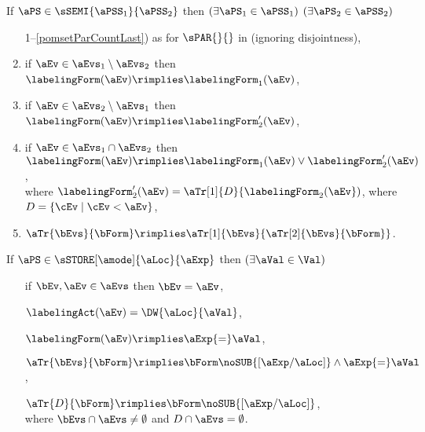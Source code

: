 \begin{definition}
  \noindent
  If $\aPS \in \sSEMI{\aPSS_1}{\aPSS_2}$ then
  $(\exists\aPS_1\in\aPSS_1)$ $(\exists\aPS_2\in\aPSS_2)$
  \begin{enumerate}[topsep=0pt]
    \setcounter{enumi}{\value{pomsetParCount}}
  \item[1--\ref{pomsetParCountLast})]
    as for $\sPAR{}{}$  in  (ignoring disjointness),
  \item \label{seq-kappa1}
    if $\aEv\in\aEvs_1\setminus\aEvs_2$ then $\labelingForm(\aEv) \rimplies \labelingForm_1(\aEv)$,
  \item \label{seq-kappa2}
    if $\aEv\in\aEvs_2\setminus\aEvs_1$ then $\labelingForm(\aEv) \rimplies \labelingForm'_2(\aEv)$,
  \item \label{seq-kappa12}
    if $\aEv\in\aEvs_1\cap\aEvs_2$ then $\labelingForm(\aEv) \rimplies \labelingForm_1(\aEv)\lor\labelingForm'_2(\aEv)$,
    \\ where $\labelingForm'_2(\aEv)=\aTr[1]{\cEvs%
    }{\labelingForm_2(\aEv})$, where $\cEvs=\{ \cEv \mid \cEv < \aEv \}$,
  \item \label{seq-tau}
    $\aTr{\bEvs}{\bForm} \rimplies \aTr[1]{\bEvs}{\aTr[2]{\bEvs}{\bForm}}$.
    \setcounter{pomsetXSemiCount}{\value{enumi}}
  \end{enumerate}

  \noindent
  If $\aPS \in \sSTORE[\amode]{\aLoc}{\aExp}$ then
  $(\exists\aVal\in\Val)$
  \begin{enumerate}[topsep=0pt]
  \item[{\labeltext[S1]{S1)}{S1}}]
    if $\bEv,\aEv\in\aEvs$ then $\bEv=\aEv$,
  \item[{\labeltext[S2]{S2)}{S2}}]
    $\labelingAct(\aEv) = \DW{\aLoc}{\aVal}$,
  \item[{\labeltext[S3]{S3)}{S3}}]
    $\labelingForm(\aEv) \rimplies \aExp{=}\aVal$,
  \item[{\labeltext[S4]{S4)}{S4}}]
    $\aTr{\bEvs}{\bForm} \rimplies \bForm\noSUB{[\aExp/\aLoc]}\land\aExp{=}\aVal$, %
  \item[{\labeltext[S5]{S5)}{S5}}]
    $\aTr{\cEvs}{\bForm} \rimplies \bForm\noSUB{[\aExp/\aLoc]}$, %
    \\ where $\bEvs\cap\aEvs\neq\emptyset$ and $\cEvs\cap\aEvs=\emptyset$.
  \end{enumerate}


\end{definition}
